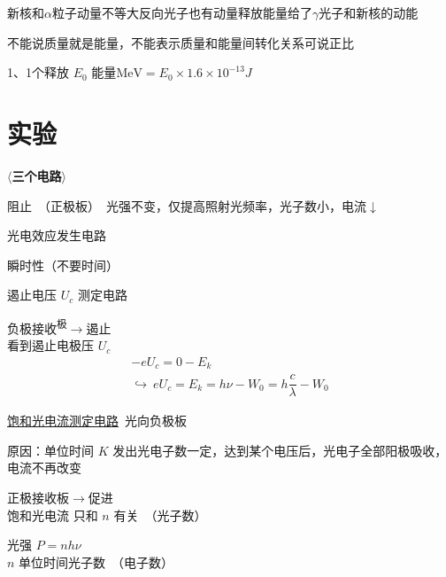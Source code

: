 新核和$\alpha$粒子动量不等大反向\quad 光子也有动量\quad 释放能量给了$\gamma$光子和新核的动能

不能说质量就是能量，不能表示质量和能量间转化关系\quad 可说正比

1、1个释放 $E_0$ 能量\quad $\mathrm{MeV}=E_0\times1.6\times10^{-13}\unit{J}$


\section{实验}
\noindent \textbf{$\langle$三个电路$\rangle$}

\noindent 阻止\ （正极板）\ 光强不变，仅提高照射光频率，光子数小，电流$\downarrow$ %

\noindent {} 光电效应发生电路

\noindent 瞬时性（不要时间） %

\noindent {} 遏止电压 $U_c$ 测定电路

\noindent 负极接收\textsuperscript{极}$\to$遏止\\ %
看到遏止电极压 $U_c$ %
\[
\begin{array}{l}
-eU_c=0-E_k\\
\hookrightarrow\ eU_c=E_k=h\nu-W_0=h\dfrac{c}{\lambda}-W_0
\end{array}
\]

\noindent {} \underline{饱和光电流测定电路}\ 光向负极板

\noindent 原因：单位时间 $K$ 发出光电子数一定，达到某个电压后，光电子全部阳极吸收，电流不再改变 %

\noindent 正极接收板$\to$促进\\
饱和光电流 只和 $n$ 有关\ （光子数）

\noindent 光强 $P=nh\nu$\\
$n$ 单位时间光子数\ （电子数）

